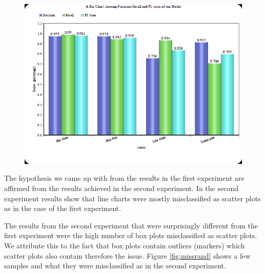 \documentclass[12pt, a4paper,oneside]{report}
\begin{document}
\begin{figure}[!htbp]
	\includegraphics [scale=0.78] {scores.png}
	\label{fig:missy}
\end{figure}

The hypothesis we came up with from the results in the first experiment are affirmed from the results achieved in the second experiment. In the second experiment results show that line charts were mostly misclassified as scatter plots as in the case of the first experiment. 

The results from the second experiment that were surprisingly different from the first experiment  were the high number of box plots misclassified as scatter plots. We attribute this to the fact that box plots contain outliers (markers) which scatter plots also contain therefore the issue. Figure \ref{fig:missrand} shows a few samples and what they were misclassified as in the second experiment. 
\end{document}
